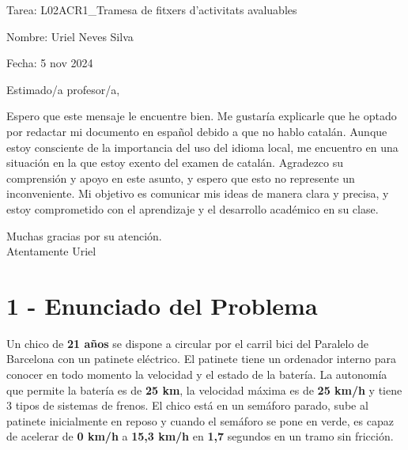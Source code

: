 \documentclass{article}
\begin{document}
\begin{titlepage}
    \centering
    {\LARGE Tarea: L02ACR1\_Tramesa de fitxers d'activitats avaluables \par}
    \vspace{1.5cm} %
    {\Large Nombre: Uriel Neves Silva \par}
    \vspace{0.5cm} %
    {\large Fecha: 5 nov 2024 \par}
    \vspace{2cm} %
 
Estimado/a profesor/a,

   \justify
Espero que este mensaje le encuentre bien. Me gustaría explicarle que he optado por redactar mi documento en español debido a que no hablo catalán. Aunque estoy consciente de la importancia del uso del idioma local, me encuentro en una situación en la que estoy exento del examen de catalán.
   \justify
Agradezco su comprensión y apoyo en este asunto, y espero que esto no represente un inconveniente. Mi objetivo es comunicar mis ideas de manera clara y precisa, y estoy comprometido con el aprendizaje y el desarrollo académico en su clase.

\begin{center}
    
Muchas gracias por su atención. \\

Atentamente
Uriel
\end{center}

\end{titlepage}

\section*{1 - Enunciado del Problema} 

Un chico de \textbf{21 años}  se dispone a circular por el carril bici del Paralelo de Barcelona con un patinete eléctrico. El patinete tiene un ordenador interno para conocer en todo momento la velocidad y el estado de la batería. La autonomía que permite la batería es de \textbf{25 km}, la velocidad máxima es de \textbf{25 km/h} y tiene 3 tipos de sistemas de frenos. El chico está en un semáforo parado, sube al patinete inicialmente en reposo y cuando el semáforo se pone en verde, es capaz de acelerar de \textbf{0 km/h} a \textbf{15,3 km/h} en \textbf{1,7} segundos en un tramo sin fricción.
\end{document}
